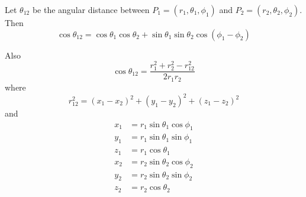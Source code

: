 \documentclass[12pt]{article}
\begin{document}
\noindent
Let $\theta_{12}$ be the angular distance between
$P_1=(r_1,\theta_1,\phi_1)$ and
$P_2=(r_2,\theta_2,\phi_2)$.
Then
\begin{equation*}
\cos\theta_{12}=\cos\theta_1\cos\theta_2+\sin\theta_1\sin\theta_2\cos(\phi_1-\phi_2)
\end{equation*}

\noindent
Also
\begin{equation*}
\cos\theta_{12}=\frac{r_1^2+r_2^2-r_{12}^2}{2r_1r_2}
\end{equation*}
where
\begin{equation*}
r_{12}^2=(x_1-x_2)^2+(y_1-y_2)^2+(z_1-z_2)^2
\end{equation*}
and
\begin{align*}
x_1&=r_1\sin\theta_1\cos\phi_1
\\
y_1&=r_1\sin\theta_1\sin\phi_1
\\
z_1&=r_1\cos\theta_1
\end{align*}
\begin{align*}
x_2&=r_2\sin\theta_2\cos\phi_2
\\
y_2&=r_2\sin\theta_2\sin\phi_2
\\
z_2&=r_2\cos\theta_2
\end{align*}
\end{document}
